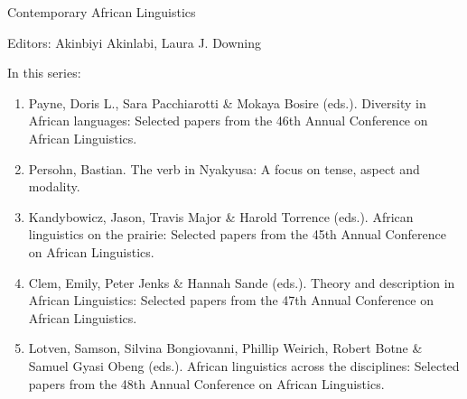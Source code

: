 {\large Contemporary African Linguistics}

\bigskip

Editors: Akinbiyi Akinlabi,  Laura J. Downing  


\bigskip

In this series:

\begin{enumerate}
\item Payne, Doris L., Sara Pacchiarotti \& Mokaya Bosire (eds.). Diversity in African languages: Selected papers from the 46th Annual Conference on African Linguistics.
\item Persohn, Bastian. The verb in Nyakyusa: A focus on tense, aspect and modality.
\item Kandybowicz, Jason, Travis Major \& Harold Torrence (eds.). African linguistics on the prairie: Selected papers from the 45th Annual Conference on African Linguistics.
\item Clem, Emily, Peter Jenks   \& Hannah Sande (eds.). Theory and description in African Linguistics: Selected papers from the 47th Annual Conference on African Linguistics.
\item Lotven, Samson, Silvina Bongiovanni, Phillip Weirich, Robert Botne \& Samuel Gyasi Obeng (eds.). African linguistics across the disciplines: Selected papers from the 48th Annual Conference on African Linguistics.
\end{enumerate}


\vfill

